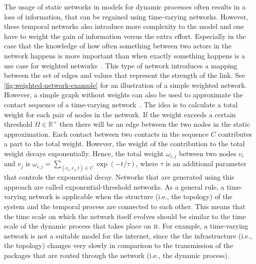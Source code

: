 The usage of static networks in models for dynamic processes often results in a loss of information, that can be regained using time-varying networks.
However, these temporal networks also introduce more complexity to the model and one have to weight the gain of information versus the extra effort.
Especially in the case that the knowledge of how often something between two actors in the network happens is more important than when exactly something happens is a use case for weighted networks~\cite{Newman2010}.
This type of network introduces a mapping between the set of edges and values that represent the strength of the link.
See \autoref{fig:weighted-network-example} for an illustration of a simple weighted network.
However, a simple graph without weights can also be used to approximate the contact sequence of a time-varying network~\cite{Holme2013}.
The idea is to calculate a total weight for each pair of nodes in the network.
If the weight exceeds a certain threshold \(\Omega \in \mathbb{R^{+}}\) then there will be an edge between the two nodes in the static approximation.
Each contact between two contacts in the sequence \(C\) contributes a part to the total weight.
However, the weight of the contribution to the total weight decays exponentially.
Hence, the total weight \(\omega_{i,j}\) between two nodes \(v_{i}\) and \(v_{j}\) is \(\omega_{i,j} = \sum_{(v_{i}, v_{j}, t) \in C} \exp(-t / \tau)\), where \(\tau\) is an additional parameter that controls the exponential decay.
Networks that are generated using this approach are called exponential-threshold networks.
As a general rule, a time-varying network is applicable when the structure (i.e., the topology) of the system and the temporal process are connected to each other.
This means that the time scale on which the network itself evolves should be similar to the time scale of the dynamic process that takes place on it.
For example, a time-varying network is not a suitable model for the internet, since the the infrastructure (i.e., the topology) changes very slowly in comparison to the transmission of the packages that are routed through the network (i.e., the dynamic process).

